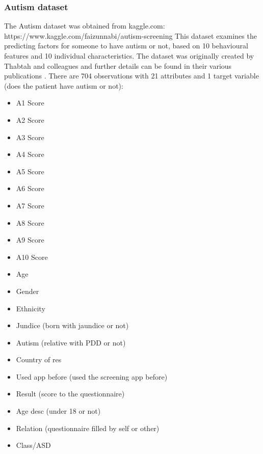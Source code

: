 \subsubsection{Autism dataset}
The Autism dataset was obtained from kaggle.com:\newline
https://www.kaggle.com/faizunnabi/autism-screening\newline
This dataset examines the predicting factors for someone to have autism or not, based on 10 behavioural features and 10 individual characteristics. The dataset was originally created by Thabtah and colleagues and further details can be found in their various publications \citep{Thabtah:2018ck}.\newline
There are 704 observations with 21 attributes and 1 target variable (does the patient have autism or not):\newline
\begin{itemize}
    \item A1 Score 
    \item A2 Score
    \item A3 Score 
    \item A4 Score
    \item A5 Score
    \item A6 Score
    \item A7 Score
    \item A8 Score
    \item A9 Score
    \item A10 Score
    \item Age
    \item Gender
    \item Ethnicity 
    \item Jundice (born with jaundice or not)
    \item Autism (relative with PDD or not)
    \item Country of res
    \item Used app before (used the screening app before)
    \item Result (score to the questionnaire)
    \item Age desc (under 18 or not)
    \item Relation (questionnaire filled by self or other)
    \item Class/ASD
\end{itemize}

